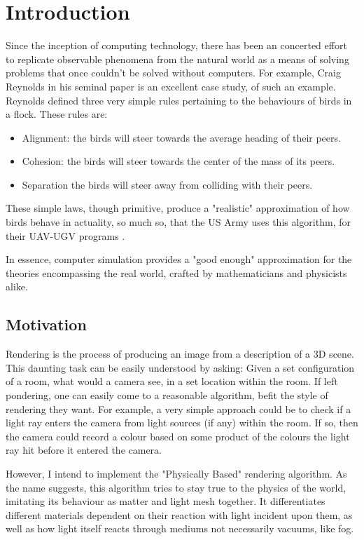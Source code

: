 \documentclass[../main.tex]{subfiles}
\begin{document}
\section{Introduction}
Since the inception of computing technology, there has been an concerted effort to replicate observable phenomena from the natural world as a means of solving problems that once couldn't be solved without computers.
\newline
For example, Craig Reynolds in his seminal paper \cite{reynoldsFlocksHerdsSchools1987} is an excellent case study, of such an example. Reynolds defined three very simple rules pertaining to the behaviours of birds in a flock. These rules are: 
\begin{itemize}
  \item Alignment: the birds will steer towards the average heading of their peers.
  \item Cohesion: the birds will steer towards the center of the mass of its peers.  
  \item Separation the birds will steer away from colliding with their peers.
\end{itemize}
These simple laws, though primitive, produce a "realistic" approximation of how birds behave in actuality, so much so, that the US Army uses this algorithm, for their UAV-UGV programs \cite{saskaCoordinationNavigationHeterogeneous2014}.

In essence, computer simulation provides a "good enough" approximation for the theories encompassing the real world, crafted by mathematicians and physicists alike.
\subsection{Motivation}
Rendering is the process of producing an image from a description of a 3D scene. This daunting task can be easily understood by asking: Given a set configuration of a room, what would a camera see, in a set location within the room. 
If left pondering, one can easily come to a reasonable algorithm, befit the style of rendering they want. For example, a very simple approach could be to check if a light ray enters the camera from light sources (if any) within the room. If so, then the camera could record a colour based on some product of the colours the light ray hit before it entered the camera. 

However, I intend to implement the "Physically Based" rendering algorithm.
As the name suggests, this algorithm tries to stay true to the physics of the world, imitating its behaviour as matter and light mesh together. It differentiates different materials dependent on their reaction with light incident upon them, as well as how light itself reacts through mediums not necessarily vacuums, like fog. 
\end{document}
